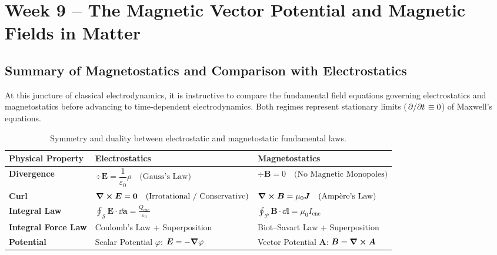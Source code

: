 \section{Week 9 -- The Magnetic Vector Potential and Magnetic Fields in Matter}

\subsection{Summary of Magnetostatics and Comparison with Electrostatics}

At this juncture of classical electrodynamics, it is instructive to compare the fundamental field equations governing electrostatics and magnetostatics before advancing to time-dependent electrodynamics. Both regimes represent stationary limits ($\pdv*{t} \equiv 0$) of Maxwell's equations.

\begin{table}[htbp]
    \centering
    \renewcommand{\arraystretch}{1.5}
    \begin{tabular}{|l|l|l|}
        \hline
        \rowcolor{ThmColor!12!white}
        \textbf{Physical Property} & \textbf{Electrostatics} & \textbf{Magnetostatics} \\ \hline
        \textbf{Divergence} & $\div \bm{E} = \dfrac{1}{\varepsilon_0}\rho \quad \text{(Gauss's Law)}$ & $\div \bm{B} = 0 \quad \text{(No Magnetic Monopoles)}$ \\ \hline
        \textbf{Curl} & $\curl \bm{E} = \bm{0} \quad \text{(Irrotational / Conservative)}$ & $\curl \bm{B} = \mu_0 \bm{J} \quad \text{(Ampère's Law)}$ \\ \hline
        \textbf{Integral Law} & $\displaystyle\oint_{\mathcal{S}} \bm{E}\cdot \dd{\bm{a}} = \frac{Q_{\text{enc}}}{\varepsilon_0}$ & $\displaystyle\oint_{\mathcal{P}} \bm{B}\cdot \dd{\bm{l}} = \mu_0 I_{\text{enc}}$ \\ \hline
        \textbf{Integral Force Law} & Coulomb's Law + Superposition & Biot--Savart Law + Superposition \\ \hline
        \textbf{Potential} & Scalar Potential $\varphi$: $\bm{E} = -\grad \varphi$ & Vector Potential $\bm{A}$: $\bm{B} = \curl \bm{A}$ \\ \hline
    \end{tabular}
    \caption{Symmetry and duality between electrostatic and magnetostatic fundamental laws.}
    \label{tab:electro_magneto_comparison}
\end{table}

